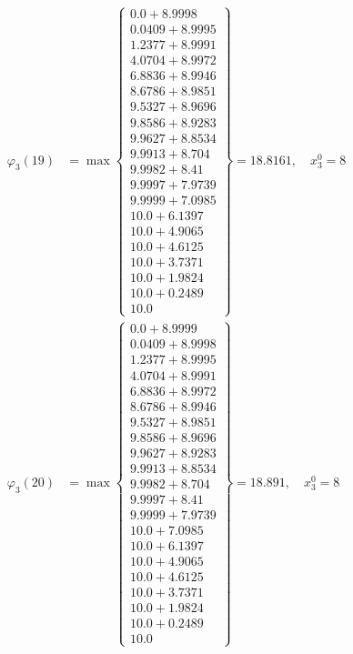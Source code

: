 \documentclass{article}
\begin{document}
\begin{align*}
  
  
  
\varphi_{3}(19) &= \max \left\{ \begin{array}{c}
0.0 + 8.9998 \\
 0.0409 + 8.9995 \\
 1.2377 + 8.9991 \\
 4.0704 + 8.9972 \\
 6.8836 + 8.9946 \\
 8.6786 + 8.9851 \\
 9.5327 + 8.9696 \\
 9.8586 + 8.9283 \\
 9.9627 + 8.8534 \\
 9.9913 + 8.704 \\
 9.9982 + 8.41 \\
 9.9997 + 7.9739 \\
 9.9999 + 7.0985 \\
 10.0 + 6.1397 \\
 10.0 + 4.9065 \\
 10.0 + 4.6125 \\
 10.0 + 3.7371 \\
 10.0 + 1.9824 \\
 10.0 + 0.2489 \\
 10.0
\end{array} \right\}=18.8161,\quad x_{3}^0=8\\
  
  
  
  
\varphi_{3}(20) &= \max \left\{ \begin{array}{c}
0.0 + 8.9999 \\
 0.0409 + 8.9998 \\
 1.2377 + 8.9995 \\
 4.0704 + 8.9991 \\
 6.8836 + 8.9972 \\
 8.6786 + 8.9946 \\
 9.5327 + 8.9851 \\
 9.8586 + 8.9696 \\
 9.9627 + 8.9283 \\
 9.9913 + 8.8534 \\
 9.9982 + 8.704 \\
 9.9997 + 8.41 \\
 9.9999 + 7.9739 \\
 10.0 + 7.0985 \\
 10.0 + 6.1397 \\
 10.0 + 4.9065 \\
 10.0 + 4.6125 \\
 10.0 + 3.7371 \\
 10.0 + 1.9824 \\
 10.0 + 0.2489 \\
 10.0
\end{array} \right\}=18.891,\quad x_{3}^0=8\\
  

\end{align*}
\end{document}
